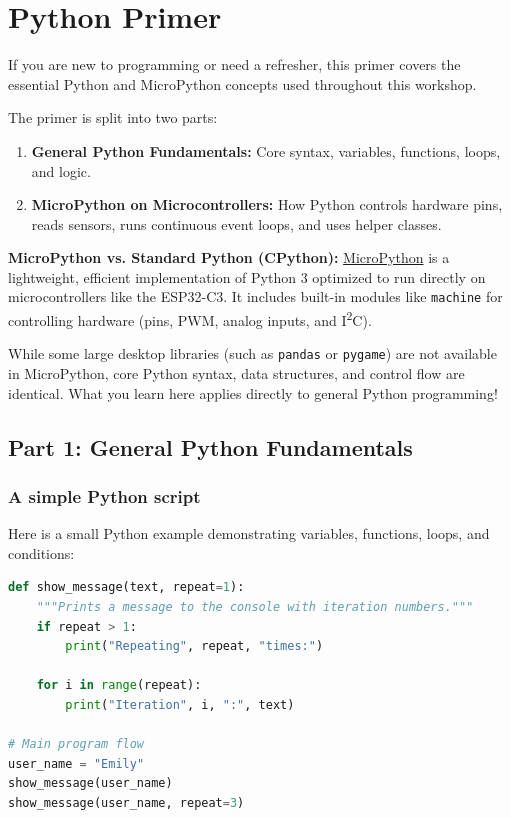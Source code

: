 \chapter{Python Primer} \label{python_primer}

If you are new to programming or need a refresher, this primer covers the essential Python
and MicroPython concepts used throughout this workshop.

The primer is split into two parts:
\begin{enumerate}
    \item \textbf{General Python Fundamentals:} Core syntax, variables, functions, loops, and logic.
    \item \textbf{MicroPython on Microcontrollers:} How Python controls hardware pins, reads sensors,
    runs continuous event loops, and uses helper classes.
\end{enumerate}

\begin{tcolorbox}[colback=blue!5!white,colframe=blue!40!black]
    \textbf{MicroPython vs. Standard Python (CPython):}
    \href{https://micropython.org/}{MicroPython} is a lightweight, efficient implementation of
    Python 3 optimized to run directly on microcontrollers like the ESP32-C3. It includes built-in
    modules like \texttt{machine} for controlling hardware (pins, PWM, analog inputs, and I\textsuperscript{2}C).

    While some large desktop libraries (such as \texttt{pandas} or \texttt{pygame}) are not available
    in MicroPython, core Python syntax, data structures, and control flow are identical. What you learn
    here applies directly to general Python programming!
\end{tcolorbox}


\section{Part 1: General Python Fundamentals}

\subsection{A simple Python script}
Here is a small Python example demonstrating variables, functions, loops, and conditions:

\begin{lstlisting}[language=Python,caption=A basic Python script]
def show_message(text, repeat=1):
    """Prints a message to the console with iteration numbers."""
    if repeat > 1:
        print("Repeating", repeat, "times:")
    
    for i in range(repeat):
        print("Iteration", i, ":", text)

# Main program flow
user_name = "Emily"
show_message(user_name)
show_message(user_name, repeat=3)
\end{lstlisting}

